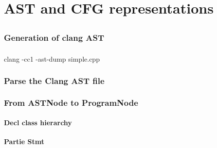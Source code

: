 \documentclass{report}
\begin{document}
\chapter{AST and CFG representations}

\paragraph{}
\hspace{4mm}\textnormal{}

\section{}

\subsection{Generation of clang AST}

\paragraph{}
\hspace{4mm}\textnormal{clang -cc1 -ast-dump simple.cpp}

\subsection{Parse the Clang AST file}

\subsection{From ASTNode to ProgramNode}

\subsubsection{\textbf{Decl} class hierarchy}

\subsubsection{Partie \textbf{Stmt}}

\paragraph{}
\hspace{4mm}\textnormal{}
\end{document}
